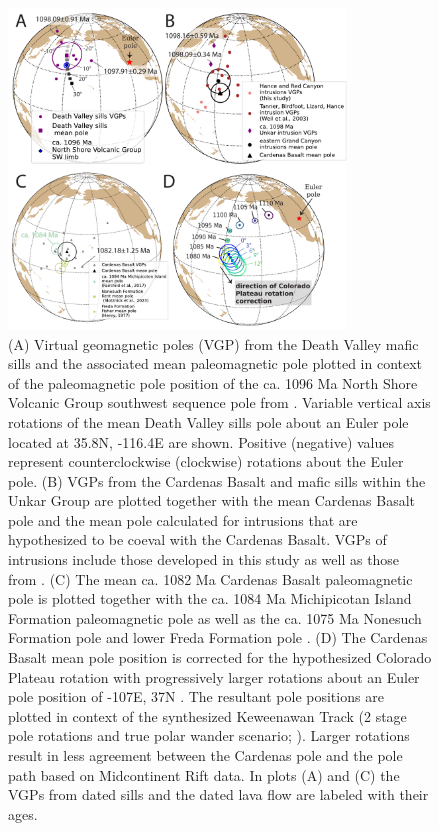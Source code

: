 \begin{figure}[h!]
\centering
\includegraphics[width=0.8\textwidth]{figure/Zhang2024b/poles.pdf}
\caption{\footnotesize (A) Virtual geomagnetic poles (VGP) from the Death Valley mafic sills and the associated mean paleomagnetic pole plotted in context of the paleomagnetic pole position of the ca. 1096 Ma North Shore Volcanic Group southwest sequence pole from . Variable vertical axis rotations of the mean Death Valley sills pole about an Euler pole located at 35.8\textdegree N, -116.4\textdegree E are shown. Positive (negative) values represent counterclockwise (clockwise) rotations about the Euler pole. (B) VGPs from the Cardenas Basalt and mafic sills within the Unkar Group are plotted together with the mean Cardenas Basalt pole and the mean pole calculated for intrusions that are hypothesized to be coeval with the Cardenas Basalt. VGPs of intrusions include those developed in this study as well as those from . (C) The mean ca. 1082 Ma Cardenas Basalt paleomagnetic pole is plotted together with the ca. 1084 Ma Michipicotan Island Formation paleomagnetic pole \cite{Fairchild2017a} as well as the ca. 1075 Ma Nonesuch Formation pole \cite{Slotznick2023a} and lower Freda Formation pole \cite{Henry1977a}. (D) The Cardenas Basalt mean pole position is corrected for the hypothesized Colorado Plateau rotation with progressively larger rotations about an Euler pole position of -107\textdegree E, 37\textdegree N \cite{Bryan1990a}. The resultant pole positions are plotted in context of the synthesized Keweenawan Track (2 stage pole rotations and true polar wander scenario; ). Larger rotations result in less agreement between the Cardenas pole and the pole path based on Midcontinent Rift data. In plots (A) and (C) the VGPs from dated sills and the dated lava flow are labeled with their ages.}
\label{fig:poles}
\end{figure}   

